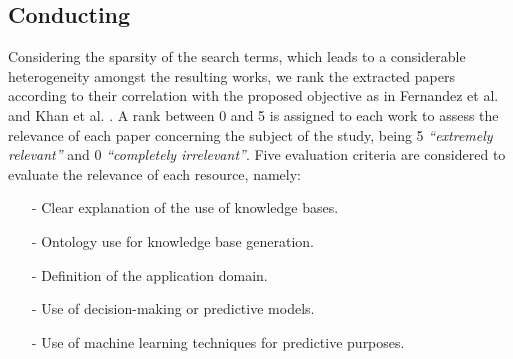 \begin{table}[H]
\caption{Established acceptance and rejection criteria. \label{tab:inclexclcrit}}
\centering
{}

\end{table}

\subsection{Conducting\label{para:relevance}}
Considering the sparsity of the search terms, which leads to a considerable heterogeneity amongst the resulting works, we rank the extracted papers according to their correlation with the proposed objective as in Fernandez et al. \citep{FERNANDEZ2011789} and Khan et al. \citep{khan2003five}. A rank between 0 and 5 is assigned to each work to assess the relevance of each paper concerning the subject of the study, being 5 \textit{``extremely relevant''} and 0 \textit{``completely irrelevant''}. Five evaluation criteria are considered to evaluate the relevance of each resource, namely:
\begin{itemize}      
\item[-] {Clear explanation of the use of knowledge bases}.
\item[-] {Ontology use for knowledge base generation}.
\item[-] {Definition of the application domain}.
\item[-] {Use of decision-making or predictive models}.
\item[-] {Use of machine learning techniques for predictive purposes}.
\end{itemize}    

